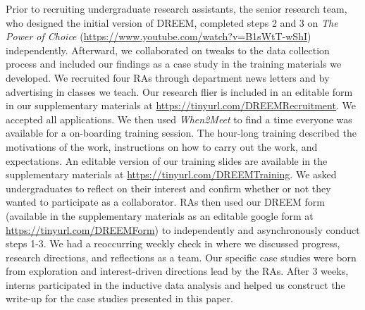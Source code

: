 Prior to recruiting undergraduate research assistants, the senior research team, who designed the initial version of DREEM, completed steps 2 and 3 on \textit{The Power of Choice} (\url{https://www.youtube.com/watch?v=B1sWtT-wShI}) independently. Afterward, we collaborated on tweaks to the data collection process and included our findings as a case study in the training materials we developed. We recruited four RAs through department news letters and by advertising in classes we teach. Our research flier is included in an editable form in our supplementary materials at \url{https://tinyurl.com/DREEMRecruitment}. We accepted all applications. We then used \textit{When2Meet} to find a time everyone was available for a on-boarding training session. The hour-long training described the motivations of the work, instructions on how to carry out the work, and expectations. An editable version of our training slides are available in the supplementary materials at \url{https://tinyurl.com/DREEMTraining}. We asked undergraduates to reflect on their interest and confirm whether or not they wanted to participate as a collaborator. RAs then used our DREEM form (available in the supplementary materials as an editable google form at \url{https://tinyurl.com/DREEMForm}) to independently and asynchronously conduct steps 1-3. We had a reoccurring weekly check in where we  discussed progress, research directions, and reflections as a team. Our specific case  studies were born from exploration and interest-driven directions lead by the RAs. After 3 weeks, interns participated in the inductive data analysis and helped us construct the write-up for the case studies presented in this paper.

